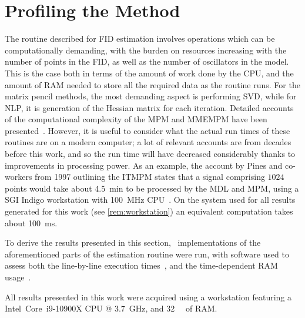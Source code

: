 \section{Profiling the Method}
\label{sec:profiling}
The routine described for \ac{FID} estimation involves operations which can be
computationally demanding, with the burden on resources
increasing with the number of points in the \ac{FID}, as well as the number of
oscillators in the model. This is the case both in terms of the amount of work
done by the \ac{CPU}, and the amount of \ac{RAM} needed to store all the
required data as the routine runs. For the matrix pencil methods, the most
demanding aspect is performing \ac{SVD}, while for \ac{NLP}, it
is generation of the Hessian matrix for each iteration. Detailed accounts of the
computational complexity of the \ac{MPM} and \ac{MMEMPM} have been
presented~\cite{Hua1992,Chen2007}.  However, it is useful to consider what the
actual run times of these routines are on a modern computer; a lot of relevant
accounts are from decades before this work, and so the
run time will have decreased considerably thanks to
improvements in processing power. As an example, the account by Pines and
co-workers from 1997 outlining the \ac{ITMPM} states that a signal comprising
$1024$ points would take about
\qty{4.5}{\minute} to be processed by the \ac{MDL} and \ac{MPM}, using a
SGI Indigo workstation with \qty{100}{\mega\hertz} \ac{CPU}~\cite{Lin1997}. On
the system used for all results generated for this work (see
\cref{rem:workstation}) an equivalent computation takes about
\qty{100}{\milli\second}.
\label{corr:pines-ram}

To derive the results presented in this section, \Python\ implementations of
the aforementioned parts of the estimation routine were run, with software used
to assess both the line-by-line execution times~\cite{LineProf}, and the
time-dependent \ac{RAM} usage~\cite{MemProf}.
\begin{remark}
    \label{rem:workstation}
    All results presented in this work were acquired using a workstation
    featuring a Intel\textregistered\ Core\texttrademark\ i9-10900X \ac{CPU} @
    \qty{3.7}{\giga\hertz}, and \qty{32}{\gibi\byte} of \ac{RAM}.
\end{remark}

